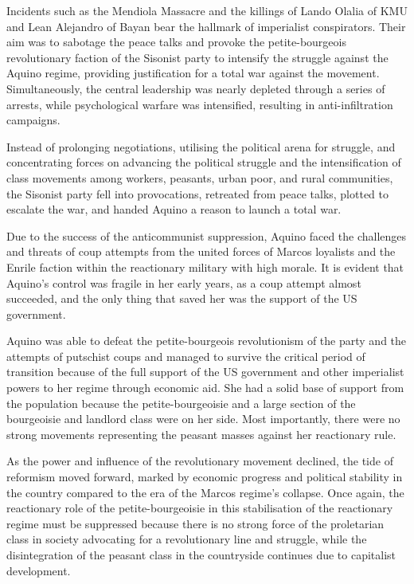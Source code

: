 Incidents such as the Mendiola Massacre and the killings of Lando Olalia of KMU 
and Lean Alejandro of Bayan bear the hallmark of imperialist conspirators. 
Their aim was to sabotage the peace talks 
and provoke the petite-bourgeois revolutionary faction of the Sisonist party 
to intensify the struggle against the Aquino regime, 
providing justification for a total war against the movement. 
Simultaneously, the central leadership was nearly depleted 
through a series of arrests, while psychological warfare was intensified, 
resulting in anti-infiltration campaigns.

Instead of prolonging negotiations, utilising the political arena for struggle, 
and concentrating forces on advancing the political struggle 
and the intensification of class movements 
among workers, peasants, urban poor, and rural communities, 
the Sisonist party fell into provocations, retreated from peace talks, 
plotted to escalate the war, and handed Aquino a reason to launch a total war.

Due to the success of the anticommunist suppression, 
Aquino faced the challenges and threats of coup attempts 
from the united forces of Marcos loyalists 
and the Enrile faction within the reactionary military with high morale. 
It is evident that Aquino's control was fragile in her early years, 
as a coup attempt almost succeeded, 
and the only thing that saved 
her was the support of the US government.

Aquino was able to defeat the petite-bourgeois revolutionism of the party 
and the attempts of putschist coups 
and managed to survive the critical period of transition 
because of the full support of the US government 
and other imperialist powers to her regime through economic aid. 
She had a solid base of support from the population 
because the petite-bourgeoisie 
and a large section of the bourgeoisie 
and landlord class were on her side. 
Most importantly, 
there were no strong movements representing the peasant masses 
against her reactionary rule.

As the power and influence of the revolutionary movement declined, 
the tide of reformism moved forward, 
marked by economic progress and political stability in the country 
compared to the era of the Marcos regime's collapse. 
Once again, the reactionary role of the petite-bourgeoisie 
in this stabilisation of the reactionary regime 
must be suppressed 
because there is no strong force of the proletarian class 
in society advocating for a revolutionary line and struggle, 
while the disintegration of the peasant class 
in the countryside continues due to capitalist development.

